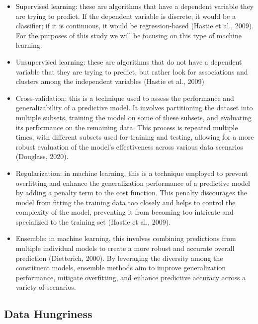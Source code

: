 \documentclass[
  man]{apa7}
\begin{document}
\begin{itemize}
\item
  Supervised learning: these are algorithms that have a dependent variable they are trying to predict.
  If the dependent variable is discrete, it would be a classifier; if it is continuous, it would be regression-based (Hastie et al., 2009).
  For the purposes of this study we will be focusing on this type of machine learning.
\item
  Unsupervised learning: these are algorithms that do not have a dependent variable that they are trying to predict, but rather look for associations and clusters among the independent variables (Hastie et al., 2009)
\item
  Cross-validation: this is a technique used to assess the performance and generalizability of a predictive model.
  It involves partitioning the dataset into multiple subsets, training the model on some of these subsets, and evaluating its performance on the remaining data.
  This process is repeated multiple times, with different subsets used for training and testing, allowing for a more robust evaluation of the model's effectiveness across various data scenarios (Douglass, 2020).
\item
  Regularization: in machine learning, this is a technique employed to prevent overfitting and enhance the generalization performance of a predictive model by adding a penalty term to the cost function.
  This penalty discourages the model from fitting the training data too closely and helps to control the complexity of the model, preventing it from becoming too intricate and specialized to the training set (Hastie et al., 2009).
\item
  Ensemble: in machine learning, this involves combining predictions from multiple individual models to create a more robust and accurate overall prediction (Dietterich, 2000).
  By leveraging the diversity among the constituent models, ensemble methods aim to improve generalization performance, mitigate overfitting, and enhance predictive accuracy across a variety of scenarios.
\end{itemize}

\subsection{Data Hungriness}\label{data-hungriness}
\end{document}
